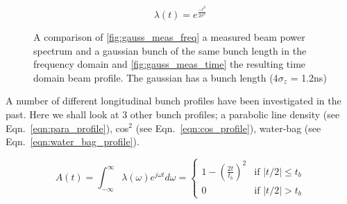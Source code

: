 \begin{equation}
\lambda \left( t \right) = e^{\frac{-t^{2}}{2\sigma^{2}}}
\label{eqn:gauss}
\end{equation}

\begin{figure}
\caption{A comparison of \ref{fig:gauss_meas_freq} a measured beam power spectrum and a gaussian bunch of the same bunch length in the frequency domain and \ref{fig:gauss_meas_time} the resulting time domain beam profile. The gaussian has a bunch length (4$\sigma_{z}$ = 1.2ns) }
\label{fig:measured_gauss}
\end{figure}

A number of different longitudinal bunch profiles have been investigated in the past. Here we shall look at 3 other bunch profiles; a parabolic line density (see Eqn.~\ref{eqn:para_profile}), cos$^{2}$ (see Eqn.~\ref{eqn:cos_profile}), water-bag (see Eqn.~\ref{eqn:water_bag_profile}).

\begin{equation}
A\left( t \right) = \int^{\infty}_{-\infty} \lambda \left( \omega \right) e^{j\omega t} d\omega = 
\begin{cases}1-\left( \frac{2t} {t_{b}} \right)^{2} &\textrm{if $| t/2 | \leq t_{b}$}\\
0								&\textrm{if $| t/2 | > t_{b}$}
\end{cases}
\label{eqn:para_profile}
\end{equation}

